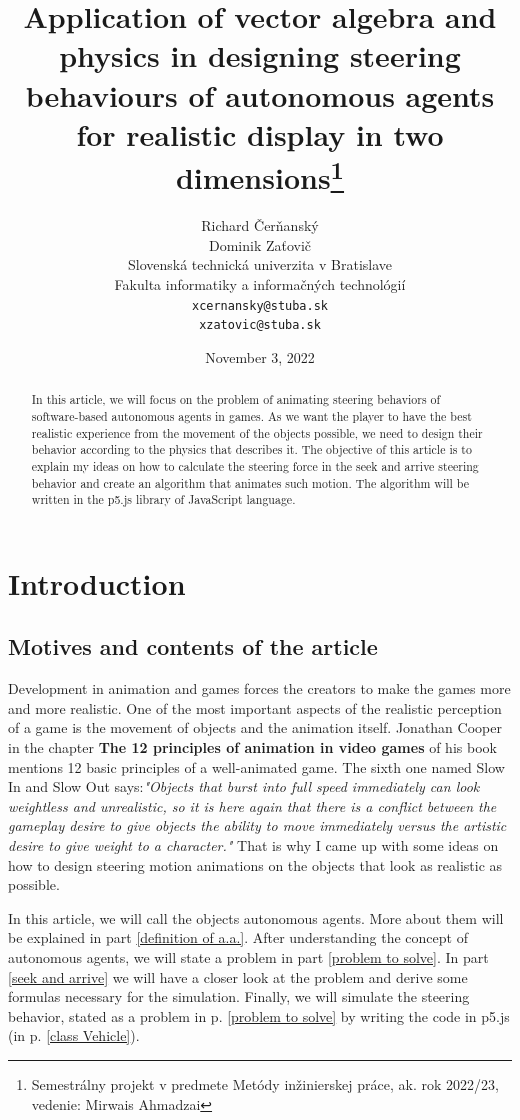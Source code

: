 \documentclass[10pt,twoside,english,a4paper]{article}
\title{Application of vector algebra and physics in 
designing steering behaviours of autonomous agents for 
realistic display in two dimensions\thanks{Semestrálny projekt v 
predmete Metódy inžinierskej práce, ak. rok 2022/23, 
vedenie: Mirwais Ahmadzai}}
\author{Richard Čerňanský\\
		Dominik Zaťovič\\[2pt]
	{\small Slovenská technická univerzita v Bratislave}\\
	{\small Fakulta informatiky a informačných technológií}\\
	{\small \texttt{xcernansky@stuba.sk}}\\
	{\small \texttt{xzatovic@stuba.sk}}
	}
\date{\small November 3, 2022 }
\begin{document}
\maketitle

\begin{abstract}

    In this article, we will focus on the problem of animating steering 
    behaviors of software-based autonomous agents in 
    games. As we want the player to have the best realistic experience 
    from the movement of the objects possible, we need to design 
    their behavior according to the physics that describes it. 
    The objective of this article is to explain my ideas on how to calculate 
    the steering force in the seek and arrive steering behavior and create 
    an algorithm that animates such motion. The algorithm will be written 
    in the p5.js library of JavaScript language. 

\end{abstract}

\section{Introduction}

\subsection{Motives and contents of the article} \label{motives}
Development in animation and games forces the creators to make 
the games more and more realistic. One of the most important 
aspects of the realistic perception of a game is the movement of 
objects and the animation itself. Jonathan Cooper in the chapter 
\textbf{The 12 principles of animation in video games}\cite{Cooper} 
of his book mentions 12 basic principles of a well-animated game. 
The sixth one named Slow In and Slow Out says:\emph{"Objects that burst into full 
speed immediately can look weightless and unrealistic, so it is here 
again that there is a conflict between the gameplay desire to give 
objects the ability to move immediately versus the artistic desire to give weight 
to a character."} That is why I came up with some ideas on how to 
design steering motion animations on the objects that look as realistic as possible.

In this article, we will call the objects autonomous agents. 
More about them will be explained in part \ref{definition of a.a.}. 
After understanding the concept of autonomous agents, we will state 
a problem in part \ref{problem to solve}. In part \ref{seek and 
arrive} we will have a closer look at the problem and derive some 
formulas necessary for the simulation. Finally, we will simulate 
the steering behavior, stated as a problem in p. \ref{problem to 
solve} by writing the code in p5.js (in p. \ref{class Vehicle}). 
\end{document}
